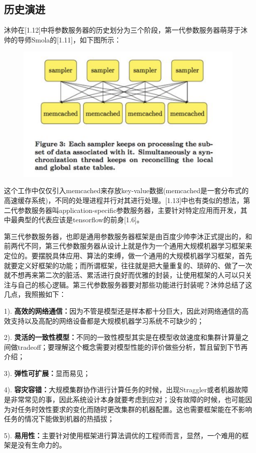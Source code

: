 \documentclass[12pt]{article}
\begin{document}
\subsection{历史演进}
沐帅在[1.12]中将参数服务器的历史划分为三个阶段，第一代参数服务器萌芽于沐帅的导师Smola的[1.11]，如下图所示：
\begin{figure}[H]
    \centering
    \includegraphics[width=.6\textwidth]{fig/Large_Scale_Parameter_Server_Epoch_1.png}
\end{figure}
这个工作中仅仅引入memcached来存放key-value数据(memcached是一套分布式的高速缓存系统)，不同的处理进程并行对其进行处理。[1.13]中也有类似的想法，第二代参数服务器叫application-specific参数服务器，主要针对特定应用而开发，其中最典型的代表应该是tensorflow的前身[1.6]。

第三代参数服务器，也即是通用参数服务器框架是由百度少帅李沐正式提出的，和前两代不同，第三代参数服务器从设计上就是作为一个通用大规模机器学习框架来定位的。要摆脱具体应用、算法的束缚，做一个通用的大规模机器学习框架，首先就要定义好框架的功能；而所谓框架，往往就是把大量重复的、琐碎的、做了一次就不想再来第二次的脏活、累活进行良好而优雅的封装，让使用框架的人可以只关注与自己的核心逻辑。第三代参数服务器要对那些功能进行封装呢？沐帅总结了这几点，我照搬如下：

1). \textbf{高效的网络通信：}因为不管是模型还是样本都十分巨大，因此对网络通信的高效支持以及高配的网络设备都是大规模机器学习系统不可缺少的；


2). \textbf{灵活的一致性模型：}不同的一致性模型其实是在模型收敛速度和集群计算量之间做tradeoff；要理解这个概念需要对模型性能的评价做些分析，暂且留到下节再介绍；

3). \textbf{弹性可扩展：}显而易见；

4). \textbf{容灾容错：}大规模集群协作进行计算任务的时候，出现Straggler或者机器故障是非常常见的事，因此系统设计本身就要考虑到应对；没有故障的时候，也可能因为对任务时效性要求的变化而随时更改集群的机器配置。这也需要框架能在不影响任务的情况下能做到机器的热插拔；

5). \textbf{易用性：}主要针对使用框架进行算法调优的工程师而言，显然，一个难用的框架是没有生命力的。
\end{document}

